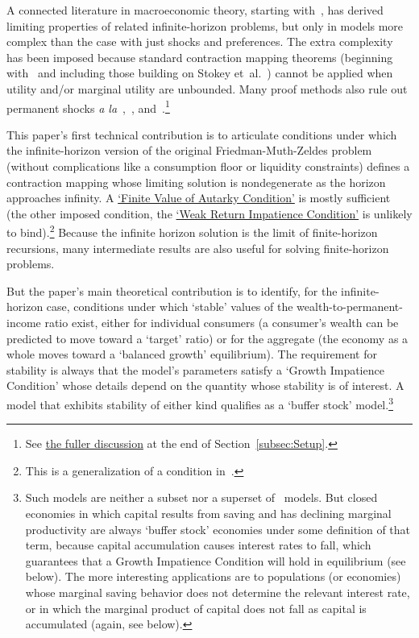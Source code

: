 \documentclass[BufferStockTheory]{subfiles}
\begin{document}
A connected literature in macroeconomic theory, starting with~\cite{bewleyPIH}, has derived limiting properties of related infinite-horizon problems, but only in models more complex than the case with just shocks and preferences. The extra complexity has been imposed because standard contraction mapping theorems (beginning with~\cite{bellmanDynamicProgramming} and including those building on Stokey et~al.~\citeyearpar{slpMethods}) cannot be applied when utility and/or marginal utility are unbounded. Many proof methods also rule out permanent shocks \textit{a la}~\cite{friedmanATheory},~\cite{muthOptimal}, and~\cite{zeldesStochastic}.\footnote{See \hyperlink{DiffFromLit}{the fuller discussion} at the end of Section~\ref{subsec:Setup}.}

This paper's first technical contribution is to articulate conditions under which the infinite-horizon version of the original Friedman-Muth-Zeldes problem (without complications like a consumption floor or liquidity constraints) defines a contraction mapping whose limiting solution is nondegenerate as the horizon approaches infinity.  A \hyperlink{FVAC}{`Finite Value of Autarky Condition'} is mostly sufficient (the other imposed condition, the \hyperlink{WRIC}{`Weak Return Impatience Condition'} is unlikely to bind).\footnote{This is a generalization of a condition in~\cite{mstIncFluct}.}  Because the infinite horizon solution is the limit of finite-horizon recursions, many intermediate results are also useful for solving finite-horizon problems.

But the paper's main theoretical contribution is to identify, for the infinite-horizon case, conditions under which `stable' values of the wealth-to-permanent-income ratio exist, either for individual consumers (a consumer's wealth can be predicted to move toward a `target' ratio) or for the aggregate (the economy as a whole moves toward a `balanced growth' equilibrium).  The requirement for stability is always that the model's parameters satisfy a `Growth Impatience Condition' whose details depend on the quantity whose stability is of interest.  A model that exhibits stability of either kind qualifies as a `buffer stock' model.\footnote{Such models are neither a subset nor a superset of~\cite{bewleyPIH} models.  But closed economies in which capital results from saving and has declining marginal productivity are always `buffer stock' economies under some definition of that term, because capital accumulation causes interest rates to fall, which guarantees that a Growth Impatience Condition will hold in equilibrium (see below).  The more interesting applications are to populations (or economies) whose marginal saving behavior does not determine the relevant interest rate, or in which the marginal product of capital does not fall as capital is accumulated (again, see below).}
\end{document}
